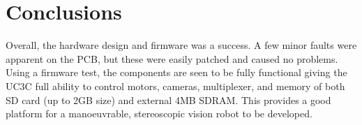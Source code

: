 \section{Conclusions}

Overall, the hardware design and firmware was a success. A few minor faults were apparent on the PCB, but these were easily patched and caused no problems. Using a firmware test, the components are seen to be fully functional giving the UC3C full ability to control motors, cameras, \itc multiplexer, and memory of both SD card (up to 2GB size) and external 4MB SDRAM. This provides a good platform for a manoeuvrable, stereoscopic vision robot to be developed. 